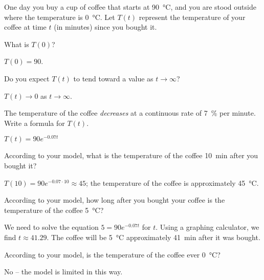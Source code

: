 \begin{exercises}
\begin{problem}
One day you buy a cup of coffee that starts at \SI{90}{\degreeCelsius}, 
and you are stood outside where the temperature is \SI{0}{\degreeCelsius}. Let
$T(t)$ represent the temperature of your coffee at time $t$ (in minutes) since you bought it.
\begin{subproblem}
	What is $T(0)$?
	\begin{shortsolution}
		$T(0)=90$. 
	\end{shortsolution}
\end{subproblem}
\begin{subproblem}
	Do you expect $T(t)$ to tend toward a value as $t\rightarrow\infty$?
	\begin{shortsolution}
		$T(t)\rightarrow 0$ as $t\rightarrow\infty$. 
	\end{shortsolution}
\end{subproblem}
\begin{subproblem}
	The temperature of the coffee \emph{decreases} at a continuous rate of \SI{7}{\percent} per minute. Write a
	formula for $T(t)$.
	\begin{shortsolution}
		$T(t)=90e^{-0.07t}$ 
	\end{shortsolution}
\end{subproblem}
\begin{subproblem}
	According to your model, what is the temperature of the coffee \SI{10}{\minute} after you bought it?
	\begin{shortsolution}
		$T(10)=90e^{-0.07\cdot 10}\approx 45$; the temperature of the coffee
		is approximately \SI{45}{\degreeCelsius}.
	\end{shortsolution}
\end{subproblem}
\begin{subproblem}
	According to your model, how long after you bought your coffee is 
	the temperature of the coffee \SI{5}{\degreeCelsius}?
	\begin{shortsolution}
		We need to solve the equation $5=90e^{-0.07t}$ for $t$. Using a graphing calculator, 
		we find $t\approx 41.29$. The coffee will be \SI{5}{\degreeCelsius} approximately \SI{41}{\minute} 
		after it was bought.
	\end{shortsolution}
\end{subproblem}
\begin{subproblem}
	According to your model, is the temperature of the coffee ever \SI{0}{\degreeCelsius}? 
	\begin{shortsolution}
		No -- the model is limited in this way. 
	\end{shortsolution}
\end{subproblem}
\end{problem}
			

\end{exercises}
